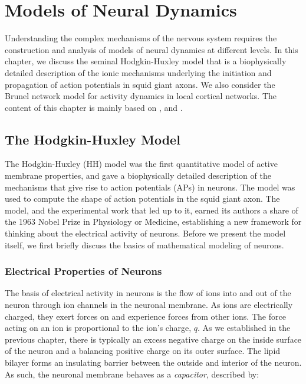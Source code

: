 \chapter{Models of Neural Dynamics}\label{chap:compneuro}

Understanding the complex mechanisms of the nervous system requires the construction and analysis of models of neural dynamics at different levels. In this chapter, we discuss the seminal Hodgkin-Huxley model \cite{HH1952} that is a biophysically detailed description of the ionic mechanisms underlying the initiation and propagation of action potentials in squid giant axons. We also consider the Brunel network model \cite{Brunel2000} for activity dynamics in local cortical networks. The content of this chapter is mainly based on \cite{Sterratt}, \cite{dayan_abbott} and \cite{neuro_dynamics}.


\section{The Hodgkin-Huxley Model}\label{sec:hh_model}

The Hodgkin-Huxley (HH) model was the first quantitative model of active membrane properties, and gave a biophysically detailed description of the mechanisms that give rise to action potentials (APs) in neurons. The model was used to compute the shape of action potentials in the squid giant axon. The model, and the experimental work that led up to it, earned its authors a share of the 1963 Nobel Prize in Physiology or Medicine, establishing a new framework for thinking about the electrical activity of neurons. Before we present the model itself, we first briefly discuss the basics of mathematical modeling of neurons. 


\subsection{Electrical Properties of Neurons}

The basis of electrical activity in neurons is the flow of ions into and out of the neuron through ion channels in the neuronal membrane. As ions are electrically charged, they exert forces on and experience forces from other ions. The force acting on an ion is proportional to the ion's charge, $q$. As we established in the previous chapter, there is typically an excess negative charge on the inside surface of the neuron and a balancing positive charge on its outer surface. The lipid bilayer forms an insulating barrier between the outside and interior of the neuron. As such, the neuronal membrane behaves as a \textit{capacitor}, described by:

